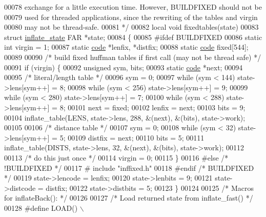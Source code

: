 \begin{DoxyCode}
00078 \textcolor{comment}{   exchange for a little execution time.  However, BUILDFIXED should not be}
00079 \textcolor{comment}{   used for threaded applications, since the rewriting of the tables and virgin}
00080 \textcolor{comment}{   may not be thread-safe.}
00081 \textcolor{comment}{ */}
00082 local \textcolor{keywordtype}{void} fixedtables(state)
00083 \textcolor{keyword}{struct }\hyperlink{structinflate__state}{inflate\_state} FAR *state;
00084 \{
00085 \textcolor{preprocessor}{#ifdef BUILDFIXED}
00086     \textcolor{keyword}{static} \textcolor{keywordtype}{int} virgin = 1;
00087     \textcolor{keyword}{static} \hyperlink{structcode}{code} *lenfix, *distfix;
00088     \textcolor{keyword}{static} \hyperlink{structcode}{code} fixed[544];
00089 
00090     \textcolor{comment}{/* build fixed huffman tables if first call (may not be thread safe) */}
00091     \textcolor{keywordflow}{if} (virgin) \{
00092         \textcolor{keywordtype}{unsigned} sym, bits;
00093         \textcolor{keyword}{static} \hyperlink{structcode}{code} *next;
00094 
00095         \textcolor{comment}{/* literal/length table */}
00096         sym = 0;
00097         \textcolor{keywordflow}{while} (sym < 144) state->lens[sym++] = 8;
00098         \textcolor{keywordflow}{while} (sym < 256) state->lens[sym++] = 9;
00099         \textcolor{keywordflow}{while} (sym < 280) state->lens[sym++] = 7;
00100         \textcolor{keywordflow}{while} (sym < 288) state->lens[sym++] = 8;
00101         next = fixed;
00102         lenfix = next;
00103         bits = 9;
00104         inflate\_table(LENS, state->lens, 288, &(next), &(bits), state->work);
00105 
00106         \textcolor{comment}{/* distance table */}
00107         sym = 0;
00108         \textcolor{keywordflow}{while} (sym < 32) state->lens[sym++] = 5;
00109         distfix = next;
00110         bits = 5;
00111         inflate\_table(DISTS, state->lens, 32, &(next), &(bits), state->work);
00112 
00113         \textcolor{comment}{/* do this just once */}
00114         virgin = 0;
00115     \}
00116 \textcolor{preprocessor}{#else }\textcolor{comment}{/* !BUILDFIXED */}\textcolor{preprocessor}{}
00117 \textcolor{preprocessor}{#   include "inffixed.h"}
00118 \textcolor{preprocessor}{#endif }\textcolor{comment}{/* BUILDFIXED */}\textcolor{preprocessor}{}
00119     state->lencode = lenfix;
00120     state->lenbits = 9;
00121     state->distcode = distfix;
00122     state->distbits = 5;
00123 \}
00124 
00125 \textcolor{comment}{/* Macros for inflateBack(): */}
00126 
00127 \textcolor{comment}{/* Load returned state from inflate\_fast() */}
00128 \textcolor{preprocessor}{#define LOAD() \(\backslash\)}

\end{DoxyCode}
